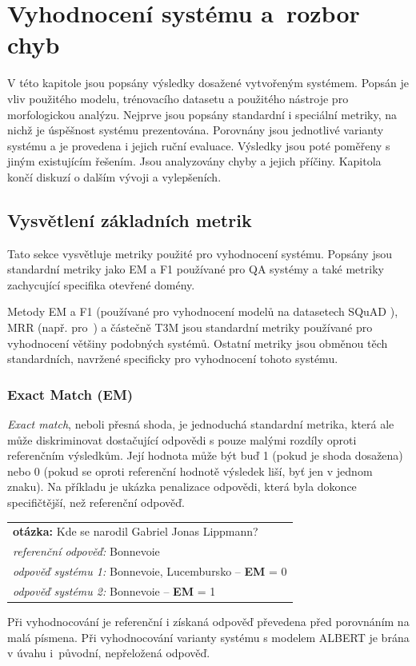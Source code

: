 
\chapter{Vyhodnocení systému a~rozbor chyb}
\label{system_evaluation}
V této kapitole jsou popsány výsledky dosažené vytvořeným systémem. Popsán je vliv použitého modelu, trénovacího datasetu a použitého nástroje pro morfologickou analýzu. Nejprve jsou popsány standardní i speciální metriky, na nichž je úspěšnost systému prezentována. Porovnány jsou jednotlivé varianty systému a je provedena i jejich ruční evaluace. Výsledky jsou poté poměřeny s jiným existujícím řešením. Jsou analyzovány chyby a jejich příčiny. Kapitola končí diskuzí o dalším vývoji a vylepšeních.


\section{Vysvětlení základních metrik}
\label{metriky}
Tato sekce vysvětluje metriky použité pro vyhodnocení systému. Popsány jsou standardní metriky jako EM a F1 používané pro QA systémy a také metriky zachycující specifika otevřené domény.\par
Metody EM a F1 (používané pro vyhodnocení modelů na datasetech SQuAD \cite{squad}\cite{squad_v2}), MRR (např. pro~\cite{sqad}) a částečně T3M jsou standardní metriky používané pro vyhodnocení většiny podobných systémů. Ostatní metriky jsou obměnou těch standardních, navržené specificky pro vyhodnocení tohoto systému.

\subsection{Exact Match (EM)}
\label{EM}
\emph{Exact match}, neboli přesná shoda, je jednoduchá standardní metrika, která ale může diskriminovat dostačující odpovědi s pouze malými rozdíly oproti referenčním výsledkům. Její hodnota může být buď 1 (pokud je shoda dosažena) nebo 0 (pokud se oproti referenční hodnotě výsledek liší, byť jen v jednom znaku). Na příkladu je ukázka penalizace odpovědi, která byla dokonce specifičtější, než referenční odpověď.\par
\begin{center}
\begin{tabular}{l}
    \textbf{otázka:} Kde se narodil Gabriel Jonas Lippmann?\\
    \emph{referenční odpověď:} Bonnevoie\\
    \emph{odpověď systému 1:} Bonnevoie, Lucembursko -- \textbf{EM} = 0\\
    \emph{odpověď systému 2:} Bonnevoie -- \textbf{EM} = 1
\end{tabular}
\end{center}
Při vyhodnocování je referenční i získaná odpověď převedena před porovnáním na malá písmena. Při vyhodnocování varianty systému s modelem ALBERT je brána v úvahu i~původní, nepřeložená odpověď.


